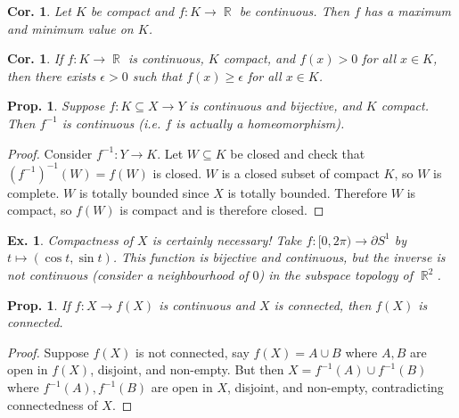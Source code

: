 \documentclass[12pt, a4paper]{book}
\DeclareMathOperator{\R}{\mathbb{R}}
\newtheorem{corollary}[theorem]{Cor.}
\newtheorem{proposition}[theorem]{Prop.}
\newtheorem{example}[theorem]{Ex.}
\theoremstyle{nonumberplain}
\newtheorem{proof}{Proof}
\begin{document}
\begin{corollary}
    Let $K$ be compact and $f:K\to\R$ be continuous. Then $f$ has a maximum and minimum value on $K$.
\end{corollary}
\begin{corollary}
    If $f:K\to\R$ is continuous, $K$ compact, and $f(x)>0$ for all $x\in K$, then there exists $\epsilon>0$ such that
    $f(x)\geq\epsilon$ for all $x\in K$.
\end{corollary}
\begin{proposition}
    Suppose $f:K\subseteq X\to Y$ is continuous and bijective, and $K$ compact. Then $f^{-1}$ is continuous (i.e. $f$
    is actually a homeomorphism).
\end{proposition}
\begin{proof}
    Consider $f^{-1}:Y\to K$. Let $W\subseteq K$ be closed and check that $(f^{-1})^{-1}(W)=f(W)$ is closed. $W$ is a
    closed subset of compact $K$, so $W$ is complete. $W$ is totally bounded since $X$ is totally bounded. Therefore
    $W$ is compact, so $f(W)$ is compact and is therefore closed.
\end{proof}
\begin{example}
    Compactness of $X$ is certainly necessary! Take $f:[0,2\pi)\to\partial S^1$ by $t\mapsto(\cos t,\sin t)$. This function
    is bijective and continuous, but the inverse is not continuous (consider a neighbourhood of $0$) in the subspace
    topology of $\R^2$.
\end{example}
\begin{proposition}
    If $f:X\to f(X)$ is continuous and $X$ is connected, then $f(X)$ is connected.
\end{proposition}
\begin{proof}
    Suppose $f(X)$ is not connected, say $f(X)=A\cup B$ where $A,B$ are open in $f(X)$, disjoint, and non-empty. But
    then $X=f^{-1}(A)\cup f^{-1}(B)$ where $f^{-1}(A),f^{-1}(B)$ are open in $X$, disjoint, and non-empty, contradicting
    connectedness of $X$.
\end{proof}
\end{document}
